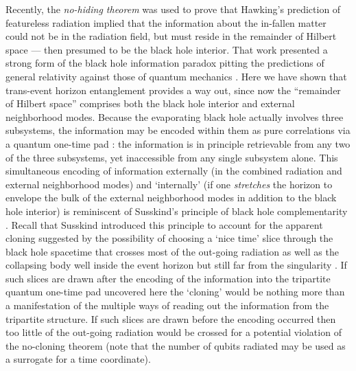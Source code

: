 \documentclass[twocolumn,aps,prl]{revtex4}
\begin{document}
Recently, the {\it no-hiding theorem} \cite{me,Kretschmann} was used to
prove that Hawking's prediction of featureless radiation implied that the
information about the in-fallen matter could not be in the radiation
field, but must reside in the remainder of Hilbert space --- then
presumed to be the black hole interior. That work presented a strong
form of the black hole information paradox pitting the predictions of
general relativity against those of quantum mechanics \cite{me}. Here
we have shown that trans-event horizon entanglement provides a way out,
since now the ``remainder of Hilbert space'' comprises both the black
hole interior and external neighborhood modes. Because the evaporating
black hole actually involves three subsystems, the information may be
encoded within them as pure correlations via a quantum one-time
pad \cite{me,Leung02}: the information is in principle retrievable from
any two of the three subsystems, yet inaccessible from any single
subsystem alone. This simultaneous encoding of information externally
(in the combined radiation and external neighborhood modes) and
`internally' (if one {\it stretches\/} the horizon to envelope the
bulk of the external neighborhood modes in addition to the black
hole interior) is reminiscent of Susskind's principle of black hole
complementarity \cite{Susskind93}. Recall that Susskind introduced
this principle to account for the apparent cloning suggested by the
possibility of choosing a `nice time' slice through the black hole
spacetime that crosses most of the out-going radiation as well as the
collapsing body well inside the event horizon but still far from the
singularity \cite{Lowe95}. If such slices are drawn after the
encoding of the information into the tripartite quantum one-time
pad uncovered here the `cloning' would be nothing more than a
manifestation of the multiple ways of reading out the information
from the tripartite structure. If such slices are drawn before the
encoding occurred then too little of the out-going radiation would be
crossed for a potential violation of the no-cloning theorem (note
that the number of qubits radiated may be used as a surrogate for a
time coordinate).

\end{document}

